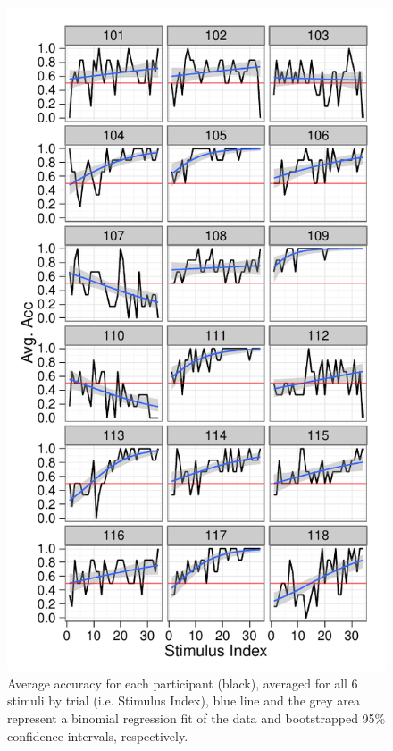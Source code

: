 \documentclass[doc,12pt]{apa}        %
\begin{document}
\begin{figure}[tp]
	\includegraphics{f_all_sS_acc}
    \centering
	\caption{Average accuracy for each participant (black), averaged for all 6 stimuli by trial (i.e. Stimulus Index), blue line and the grey area represent a binomial regression fit of the data and bootstrapped 95\% confidence intervals, respectively.}
	\label{fig:sacc}
\end{figure}
\end{document}
